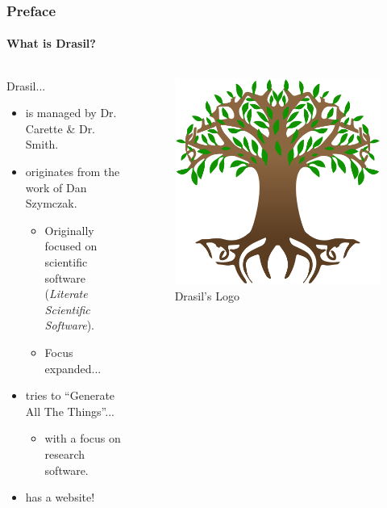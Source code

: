 \documentclass{beamer}
\begin{document}
\begin{frame}
    \frametitle{Preface}
    \framesubtitle{What is Drasil?}
    \begin{columns}[T,onlytextwidth]
        \begin{column}{.5\textwidth}
            Drasil...
            \newline \newline
            \begin{minipage}{\textwidth}
                \begin{itemize}
                    \item<1-> is managed by Dr. Carette \& Dr. Smith.
                    \item<2-> originates from the work of Dan Szymczak.
                        \begin{itemize}
                            \item<3-> Originally focused on scientific software (\emph{Literate Scientific Software}).
                            \item<4-> Focus expanded...
                        \end{itemize}
                    \item<5-> tries to ``Generate All The Things''...
                    \begin{itemize}
                        \item<6-> with a focus on research software.
                    \end{itemize}
                    \item<7-> has a website\footnotemark[1]!
                \end{itemize}
            \end{minipage}
        \end{column}
        \begin{column}{.45\textwidth}
            \begin{figure}
                \includegraphics[width=.8\textwidth]{assets/drasil-logo.png}
                \caption{Drasil's Logo \tiny\cite{Drasil2021}\cite{YggdrasilWiki2021}}
            \end{figure}
        \end{column}
    \end{columns}


\end{frame}
\end{document}
